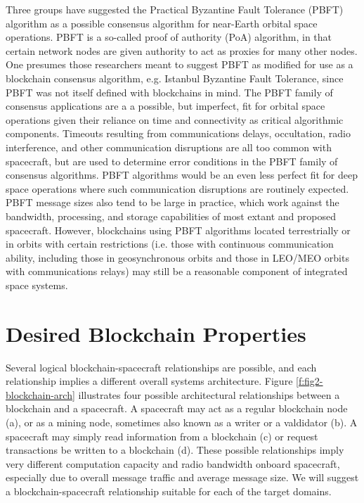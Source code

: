 \documentclass[]{aiaa-tc}%
\begin{document}
Three groups have suggested the Practical Byzantine Fault Tolerance (PBFT) algorithm\cite{castro_practical_1999} as a possible consensus algorithm for near-Earth orbital space operations\cite{yu_blockchain_2019,molesky_blockchain_2018,mital_blockchain_2019}. PBFT is a so-called proof of authority (PoA) algorithm, in that certain network nodes are given authority to act as proxies for many other nodes. One presumes those researchers meant to suggest PBFT as modified for use as a blockchain consensus algorithm, e.g. Istanbul Byzantine Fault Tolerance\cite{lin_istanbul_2017}, since PBFT was not itself defined with blockchains in mind. The PBFT family of consensus applications are a a possible, but imperfect, fit for orbital space operations given their reliance on time and connectivity as critical algorithmic components. Timeouts resulting from communications delays, occultation, radio interference, and other communication disruptions are all too common with spacecraft, but are used to determine error conditions in the PBFT family of consensus algorithms. PBFT algorithms would be an even less perfect fit for deep space operations where such communication disruptions are routinely expected. PBFT message sizes also tend to be large in practice, which work against the bandwidth, processing, and storage capabilities of most extant and proposed spacecraft. However, blockchains using PBFT algorithms located terrestrially or in orbits with certain restrictions (i.e. those with continuous communication ability, including those in geosynchronous orbits and those in LEO/MEO orbits with communications relays) may still be a reasonable component of integrated space systems.


\section{Desired Blockchain Properties}\label{sec:desiredproperties}

Several logical blockchain-spacecraft relationships are possible, and each relationship implies a different overall systems architecture. Figure \ref{f:fig2-blockchain-arch} illustrates four possible architectural relationships between a blockchain and a spacecraft. A spacecraft may act as a regular blockchain node (a), or as a mining node, sometimes also known as a writer or a valdidator (b). A spacecraft may simply read information from a blockchain (c) or request transactions be written to a blockchain (d). These possible relationships imply very different computation capacity and radio bandwidth onboard spacecraft, especially due to overall message traffic and average message size. We will suggest a blockchain-spacecraft relationship suitable for each of the target domains.
\end{document}
